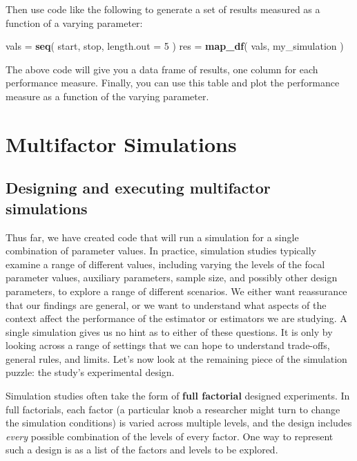 \documentclass[
]{book}
\newenvironment{Shaded}{\begin{snugshade}}{\end{snugshade}}
\newcommand{\AttributeTok}[1]{\textcolor[rgb]{0.13,0.29,0.53}{#1}}
\newcommand{\DecValTok}[1]{\textcolor[rgb]{0.00,0.00,0.81}{#1}}
\newcommand{\FunctionTok}[1]{\textcolor[rgb]{0.13,0.29,0.53}{\textbf{#1}}}
\newcommand{\NormalTok}[1]{#1}
\newcommand{\OtherTok}[1]{\textcolor[rgb]{0.56,0.35,0.01}{#1}}
\begin{document}
Then use code like the following to generate a set of results measured as a function of a varying parameter:

\begin{Shaded}
\begin{Highlighting}[]
\NormalTok{vals }\OtherTok{=} \FunctionTok{seq}\NormalTok{( start, stop, }\AttributeTok{length.out =} \DecValTok{5}\NormalTok{ )}
\NormalTok{res }\OtherTok{=} \FunctionTok{map\_df}\NormalTok{( vals, my\_simulation ) }
\end{Highlighting}
\end{Shaded}

The above code will give you a data frame of results, one column for each performance measure.
Finally, you can use this table and plot the performance measure as a function of the varying parameter.

\part{Multifactor Simulations}\label{part-multifactor-simulations}

\chapter{Designing and executing multifactor simulations}\label{exp-design}

Thus far, we have created code that will run a simulation for a single combination of parameter values.
In practice, simulation studies typically examine a range of different values, including varying the levels of the focal parameter values, auxiliary parameters, sample size, and possibly other design parameters, to explore a range of different scenarios.
We either want reassurance that our findings are general, or we want to understand what aspects of the context affect the performance of the estimator or estimators we are studying.
A single simulation gives us no hint as to either of these questions.
It is only by looking across a range of settings that we can hope to understand trade-offs, general rules, and limits.
Let's now look at the remaining piece of the simulation puzzle: the study's experimental design.

Simulation studies often take the form of \textbf{full factorial} designed experiments.
In full factorials, each factor (a particular knob a researcher might turn to change the simulation conditions) is varied across multiple levels, and the design includes \emph{every} possible combination of the levels of every factor. One way to represent such a design is as a list of the factors and levels to be explored.
\end{document}
